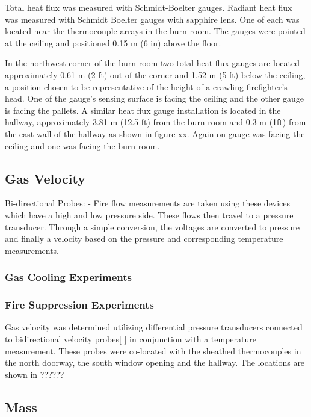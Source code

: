 \documentclass[12pt,oneside]{book}
\begin{document}
Total heat flux was measured with Schmidt-Boelter gauges.  Radiant heat flux was measured with Schmidt Boelter gauges with sapphire lens.  One of each was located near the thermocouple arrays in the burn room.  The gauges were pointed at the ceiling and positioned 0.15 m (6 in) above the floor.  

In the northwest corner of the burn room two total heat flux gauges are located approximately 0.61 m (2 ft) out of the corner and 1.52 m (5 ft) below the ceiling, a position chosen to be representative of the height of a crawling firefighter's head.  One of the gauge's sensing surface is facing the ceiling and the other gauge is facing the pallets.  A similar heat flux gauge installation is located in the hallway, approximately 3.81 m (12.5 ft) from the burn room and 0.3 m (1ft) from the east wall of the hallway as shown in figure xx.  Again on gauge was facing the ceiling and one was facing the burn room.  

\subsection{Gas Velocity}
\label{subsec:Gas_Velocity}

Bi-directional Probes:
- Fire flow measurements are taken using these devices which have a high and low pressure side.  These flows then travel to a pressure transducer.  Through a simple conversion, the voltages are converted to pressure and finally a velocity based on the pressure and corresponding temperature measurements.

\subsubsection{Gas Cooling Experiments}
\label{subsubsec:Gas_Cooling_Gas_Velocity_Instrumentation}

\subsubsection{Fire Suppression Experiments}
\label{subsubsec:Fire_Suppression_Gas_Velocity_Instrumentation}

Gas velocity was determined utilizing differential pressure transducers connected to bidirectional velocity probes[ ] in conjunction with a temperature measurement.  These probes were co-located with the sheathed thermocouples in the north doorway, the south window opening and the hallway.  The locations are shown in ??????

\subsection{Mass}
\label{subsec:Mass}
\end{document}
